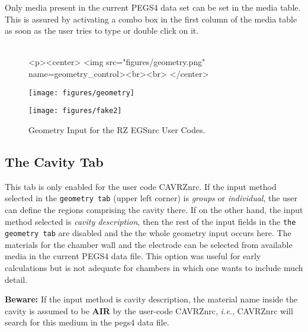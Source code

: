 \documentclass[12pt,twoside]{article}   %
\newcommand{\ie}{{\em i.e.}}
\begin{document}
Only media present in the current PEGS4 data set can be set in the media table. This is assured by
activating a combo box in the first column of the media table as soon as the user tries to type
or double click on it. \\ \\

\begin{figure}[htb]
\begin{htmlonly}
\begin{rawhtml}
<p><center>
<img src="figures/geometry.png" name=geometry_control><br><br>
</center>
\end{rawhtml}
\end{htmlonly}
\begin{latexonly}
\begin{center}
\texttt{[image: figures/geometry]}
\end{center}
\end{latexonly}
\begin{center}
\texttt{[image: figures/fake2]}
\end{center}
\caption{Geometry Input for the RZ EGSnrc User Codes.}
\label{geometry_control}
\end{figure}

\newpage
\subsection{The Cavity Tab}

This tab is only enabled for the user code CAVRZnrc. If the input method selected in the
{\tt geometry tab} (upper left corner) is {\em groups} or {\em individual}, the user can
define the regions comprising the cavity there. If on the other hand, the input method selected
is {\em cavity description}, then the rest of the input fields in the {\tt the geometry tab}
are disabled and the the whole geometry input occurs here. The materials for the chamber wall
and the electrode can be selected from available media in the current PEGS4 data file.
This option was useful for early calculations but is not adequate for chambers in which one
wants to include much detail.

{\bf Beware:} If the input method is cavity description, the material name inside the cavity is
assumed to be {\bf AIR} by the user-code CAVRZnrc, \ie, CAVRZnrc will search for this medium in
the pegs4 data file. \\ \\
\end{document}
